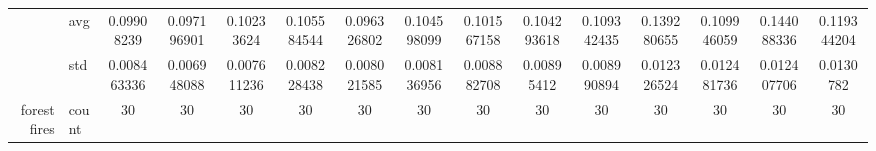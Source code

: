 \begin{table}[H]
{\begin{tabular}{rlccc|c|c|c|c|c|ccccc}
			                                                                               & avg                & \cellcolor[rgb]{ .588,  .8,  .49}0.09908239                                    & \cellcolor[rgb]{ .451,  .761,  .482}0.097196901                                & \cellcolor[rgb]{ .831,  .871,  .506}0.10233624                                 & \cellcolor[rgb]{ 1,  .91,  .518}0.105584544     & \cellcolor[rgb]{ .388,  .745,  .482}\textcolor[rgb]{ 0,  .38,  0}{0.096326802} & \cellcolor[rgb]{ 1,  .922,  .518}0.104598099    & \cellcolor[rgb]{ .773,  .855,  .502}0.101567158                                & \cellcolor[rgb]{ .976,  .914,  .514}0.104293618 & \cellcolor[rgb]{ 1,  .863,  .506}0.109342435    & \cellcolor[rgb]{ .976,  .475,  .435}0.139280655 & \cellcolor[rgb]{ 1,  .855,  .506}0.109946059    & \cellcolor[rgb]{ .973,  .412,  .42}0.144088336  & \cellcolor[rgb]{ .992,  .733,  .482}0.119344204 \\
			                                                                               & std                & 0.008463336                                                                    & 0.006948088                                                                    & 0.007611236                                                                    & 0.008228438                                     & 0.008021585                                                                    & 0.008136956                                     & 0.008882708                                                                    & 0.00895412                                      & 0.008990894                                     & 0.012326524                                     & 0.012481736                                     & 0.012407706                                     & 0.0130782                                       \\
			forest fires                                                                   & count              & 30                                                                             & 30                                                                             & 30                                                                             & 30                                              & 30                                                                             & 30                                              & 30                                                                             & 30                                              & 30                                              & 30                                              & 30                                              & 30                                              & 30                                              \\

\end{tabular}}
\end{table}
